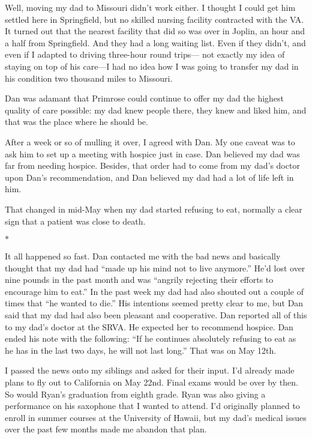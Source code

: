 \documentclass[12pt]{book}
\begin{document}
Well, moving my dad to Missouri didn't work either. I thought I could get him settled here in Springfield, but no skilled nursing facility contracted with the VA. It turned out that the nearest facility that did so was over in Joplin, an hour and a half from Springfield. And they had a long waiting list. Even if they didn't, and even if I adapted to driving three-hour round trips--- not exactly my idea of staying on top of his care---I had no idea how I was going to transfer my dad in his condition two thousand miles to Missouri.

Dan was adamant that Primrose could continue to offer my dad the highest quality of care possible: my dad knew people there, they knew and liked him, and that was the place where he should be.

After a week or so of mulling it over, I agreed with Dan. My one caveat was to ask him to set up a meeting with hospice just in case. Dan believed my dad was far from needing hospice. Besides, that order had to come from my dad's doctor upon Dan's recommendation, and Dan believed my dad had a lot of life left in him.

That changed in mid-May when my dad started refusing to eat, normally a clear sign that a patient was close to death.

\begin{center}$*$\end{center}

It all happened so fast. Dan contacted me with the bad news and basically thought that my dad had ``made up his mind not to live anymore.'' He'd lost over nine pounds in the past month and was ``angrily rejecting their efforts to encourage him to eat.'' In the past week my dad had also shouted out a couple of times that ``he wanted to die.'' His intentions seemed pretty clear to me, but Dan said that my dad had also been pleasant and cooperative. Dan reported all of this to my dad's doctor at the SRVA. He expected her to recommend hospice. Dan ended his note with the following: ``If he continues absolutely refusing to eat as he has in the last two days, he will not last long.'' That was on May 12th.

I passed the news onto my siblings and asked for their input. I'd already made plans to fly out to California on May 22nd. Final exams would be over by then. So would Ryan's graduation from eighth grade. Ryan was also giving a performance on his saxophone that I wanted to attend. I'd originally planned to enroll in summer courses at the University of Hawaii, but my dad's medical issues over the past few months made me abandon that plan.
\end{document}
